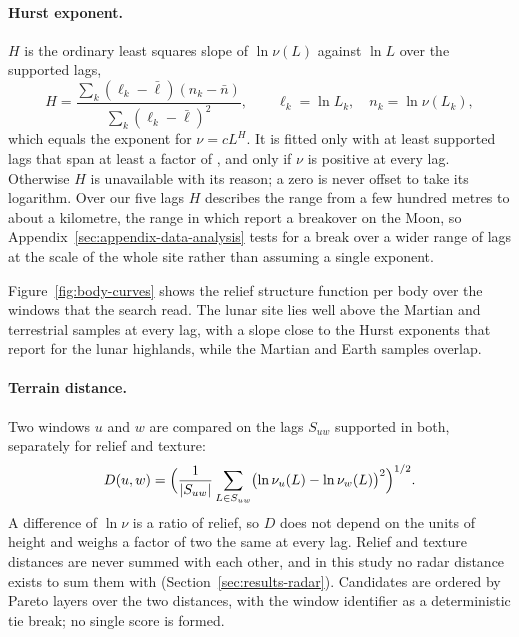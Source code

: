 \paragraph{Hurst exponent.} $H$ is the ordinary least squares slope of $\ln \nu(L)$ against
$\ln L$ over the supported lags,
\begin{equation}
  H = \frac{\sum_k (\ell_k - \bar\ell)(n_k - \bar n)}{\sum_k (\ell_k - \bar\ell)^2},
  \qquad \ell_k = \ln L_k,\quad n_k = \ln \nu(L_k),
  \label{eq:hurst}
\end{equation}
which equals the exponent for $\nu = c L^H$. It is fitted only with at least \ConfigMinLagsH{}
supported lags that span at least a factor of \ConfigLagSpan, and only if $\nu$ is positive at
every lag. Otherwise $H$ is unavailable with its reason; a zero is never offset to take its
logarithm. Over our five lags $H$ describes the range from a few hundred metres to about a
kilometre, the range in which \citet{rosenburg2011} report a breakover on the Moon, so
Appendix~\ref{sec:appendix-data-analysis} tests for a break over a wider range of lags at the scale of the whole site rather than assuming a single exponent.

Figure~\ref{fig:body-curves} shows the relief structure function per body over the windows that
the search read. The lunar site lies well above the Martian and terrestrial samples at every lag,
with a slope close to the Hurst exponents that \citet{rosenburg2011} report for the lunar
highlands, while the Martian and Earth samples overlap.



\paragraph{Terrain distance.} Two windows $u$ and $w$ are compared on the lags $S_{uw}$ supported
in both, separately for relief and texture:
\begin{equation}
  D(u, w) = \Bigl(\frac{1}{\lvert S_{uw}\rvert} \sum_{L \in S_{uw}}
  \bigl(\ln \nu_u(L) - \ln \nu_w(L)\bigr)^2\Bigr)^{1/2}.
  \label{eq:distance}
\end{equation}
A difference of $\ln \nu$ is a ratio of relief, so $D$ does not depend on the units of height and
weighs a factor of two the same at every lag. Relief and texture distances are never summed with
each other, and in this study no radar distance exists to sum them with
(Section~\ref{sec:results-radar}). Candidates are ordered by Pareto layers over the two distances,
with the window identifier as a deterministic tie break; no single score is formed.


